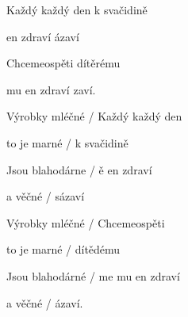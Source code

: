 

\zs
Každý  každý den k svačidině

 en zdraví ázaví 

Chcemeospěti dítěrému

 mu en zdraví zaví. 
\ks

\zr
Výrobky mléčné / Každý  každý den

to je marné / k svačidině

Jsou blahodárne / ě en zdraví

a věčné / sázaví 

Výrobky mléčné / Chcemeospěti

to je marné / dítědému

Jsou blahodárné / me mu en zdraví

a věčné / ázaví. 

\kr

\zr \kr
\kp


















